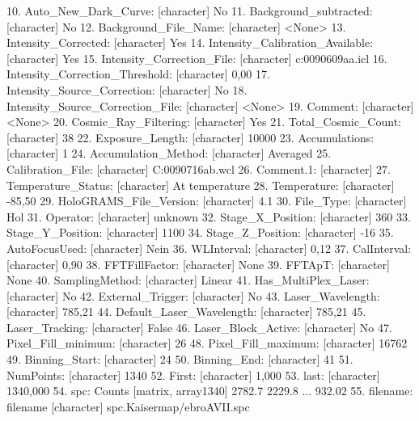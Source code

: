 \documentclass[english, a4paper, 10pt, headings=small, DIV11]{scrartcl}
\renewenvironment{Schunk}{\vspace{0pt}\begin{small}}{\end{small}\vspace{0pt}}
\begin{document}
\begin{Schunk}
\begin{Soutput}
   10. Auto_New_Dark_Curve:  [character] No 
   11. Background_subtracted:  [character] No 
   12. Background_File_Name:  [character] <None> 
   13. Intensity_Corrected:  [character] Yes 
   14. Intensity_Calibration_Available:  [character] Yes 
   15. Intensity_Correction_File:  [character] c:\hologram\calibration\intensity\20090609aa.icl 
   16. Intensity_Correction_Threshold:  [character] 0,00%
   17. Intensity_Source_Correction:  [character] No 
   18. Intensity_Source_Correction_File:  [character] <None> 
   19. Comment:  [character] <None> 
   20. Cosmic_Ray_Filtering:  [character] Yes 
   21. Total_Cosmic_Count:  [character] 38 
   22. Exposure_Length:  [character] 10000 
   23. Accumulations:  [character] 1 
   24. Accumulation_Method:  [character] Averaged 
   25. Calibration_File:  [character] C:\HoloGRAM\calibration\Wavelength\20090716ab.wcl 
   26. Comment.1:  [character]  
   27. Temperature_Status:  [character] At temperature 
   28. Temperature:  [character] -85,50 
   29. HoloGRAMS_File_Version:  [character] 4.1 
   30. File_Type:  [character] Hol 
   31. Operator:  [character] unknown 
   32. Stage_X_Position:  [character] 360 
   33. Stage_Y_Position:  [character] 1100 
   34. Stage_Z_Position:  [character] -16 
   35. AutoFocusUsed:  [character] Nein 
   36. WLInterval:  [character] 0,12 
   37. CalInterval:  [character] 0,90 
   38. FFTFillFactor:  [character] None 
   39. FFTApT:  [character] None 
   40. SamplingMethod:  [character] Linear 
   41. Has_MultiPlex_Laser:  [character] No 
   42. External_Trigger:  [character] No 
   43. Laser_Wavelength:  [character] 785,21 
   44. Default_Laser_Wavelength:  [character] 785,21 
   45. Laser_Tracking:  [character] False 
   46. Laser_Block_Active:  [character] No 
   47. Pixel_Fill_minimum:  [character] 26 
   48. Pixel_Fill_maximum:  [character] 16762 
   49. Binning_Start:  [character] 24 
   50. Binning_End:  [character] 41 
   51. NumPoints:  [character] 1340 
   52. First:  [character] 1,000 
   53. last:  [character] 1340,000 
   54. spc: Counts [matrix, array1340] 2782.7 2229.8 ... 932.02 
   55. filename: filename [character] spc.Kaisermap/ebroAVII.spc 
\end{Soutput}
\end{Schunk}
\end{document}
